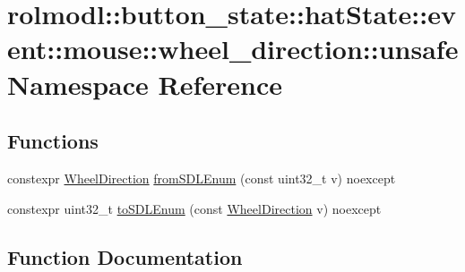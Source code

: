 \hypertarget{namespacerolmodl_1_1button__state_1_1hat_state_1_1event_1_1mouse_1_1wheel__direction_1_1unsafe}{}\section{rolmodl\+::button\+\_\+state\+::hat\+State\+::event\+::mouse\+::wheel\+\_\+direction\+::unsafe Namespace Reference}
\label{namespacerolmodl_1_1button__state_1_1hat_state_1_1event_1_1mouse_1_1wheel__direction_1_1unsafe}
\subsection*{Functions}
\begin{DoxyCompactItemize}
\item 
constexpr \mbox{\hyperlink{namespacerolmodl_1_1button__state_1_1hat_state_1_1event_1_1mouse_a203bba850745831e5abea03c154853dd}{Wheel\+Direction}} \mbox{\hyperlink{namespacerolmodl_1_1button__state_1_1hat_state_1_1event_1_1mouse_1_1wheel__direction_1_1unsafe_abfcf2ca40abd901081abb59c8e96bd1f}{from\+S\+D\+L\+Enum}} (const uint32\+\_\+t v) noexcept
\item 
constexpr uint32\+\_\+t \mbox{\hyperlink{namespacerolmodl_1_1button__state_1_1hat_state_1_1event_1_1mouse_1_1wheel__direction_1_1unsafe_ae081c3ed0c6e351a759e69244823129d}{to\+S\+D\+L\+Enum}} (const \mbox{\hyperlink{namespacerolmodl_1_1button__state_1_1hat_state_1_1event_1_1mouse_a203bba850745831e5abea03c154853dd}{Wheel\+Direction}} v) noexcept
\end{DoxyCompactItemize}


\subsection{Function Documentation}
\mbox{\label{namespacerolmodl_1_1button__state_1_1hat_state_1_1event_1_1mouse_1_1wheel__direction_1_1unsafe_abfcf2ca40abd901081abb59c8e96bd1f}} 
